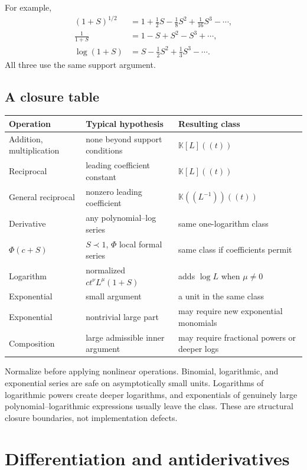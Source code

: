 \documentclass[11pt,oneside]{book}
\theoremstyle{definition}
\theoremstyle{remark}
\newcommand{\K}{\mathbb K}
\newcommand{\precdom}{\prec}
\begin{document}
For example,
\begin{align*}
 (1+S)^{1/2}&=1+\frac12S-\frac18S^2+\frac1{16}S^3-\cdots,\\
 \frac{1}{1+S}&=1-S+S^2-S^3+\cdots,\\
 \log(1+S)&=S-\frac12S^2+\frac13S^3-\cdots.
\end{align*}
All three use the same support argument.

\section{A closure table}
\begin{center}
\begin{tabularx}{0.96\textwidth}{@{}lX X@{}}
\toprule
Operation & Typical hypothesis & Resulting class \\
\midrule
Addition, multiplication & none beyond support conditions
 & $\K[L]((t))$ \\
Reciprocal & leading coefficient constant
 & $\K[L]((t))$ \\
General reciprocal & nonzero leading coefficient
 & $\K((L^{-1}))((t))$ \\
Derivative & any polynomial--log series
 & same one-logarithm class \\
$\Phi(c+S)$ & $S\precdom1$, $\Phi$ local formal series
 & same class if coefficients permit \\
Logarithm & normalized $ct^\nu L^\mu(1+S)$
 & adds $\log L$ when $\mu\ne0$ \\
Exponential & small argument
 & a unit in the same class \\
Exponential & nontrivial large part
 & may require new exponential monomials \\
Composition & large admissible inner argument
 & may require fractional powers or deeper logs \\
\bottomrule
\end{tabularx}
\end{center}

\begin{summarybox}
Normalize before applying nonlinear operations.  Binomial, logarithmic, and
exponential series are safe on asymptotically small units.  Logarithms of
logarithmic powers create deeper logarithms, and exponentials of genuinely
large polynomial--logarithmic expressions usually leave the class.  These are
structural closure boundaries, not implementation defects.
\end{summarybox}


\chapter{Differentiation and antiderivatives}
\label{ch:differentiation}
\end{document}
